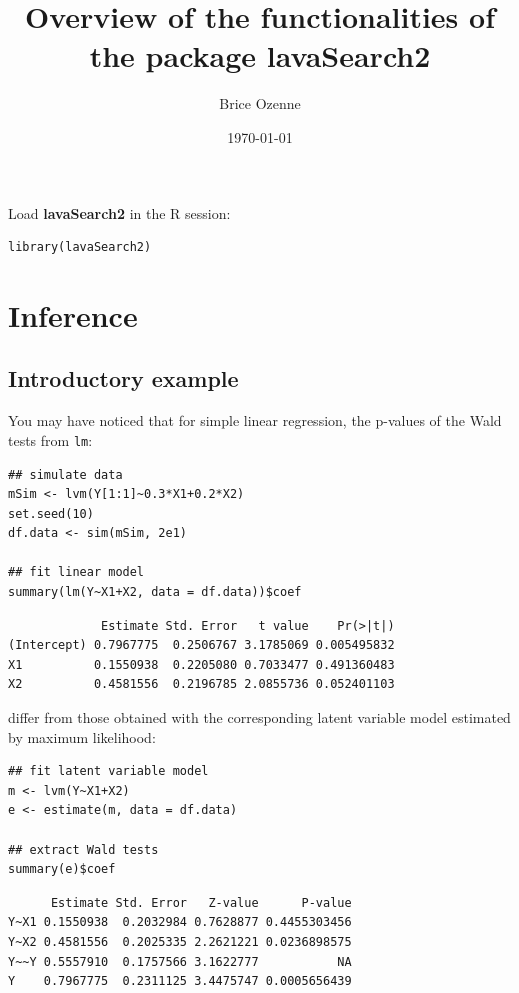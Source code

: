 \documentclass[12pt]{article}
\author{Brice Ozenne}
\date{\today}
\title{Overview of the functionalities of the package lavaSearch2}
\begin{document}
\maketitle
Load \textbf{lavaSearch2} in the R session:
\lstset{language=r,label= ,caption= ,captionpos=b,numbers=none}
\begin{lstlisting}
library(lavaSearch2)
\end{lstlisting}

\section{Inference}
\label{sec:orgd83149a}
\subsection{Introductory example}
\label{sec:org7647657}
You may have noticed that for simple linear regression, the p-values
of the Wald tests from \texttt{lm}:
\lstset{language=r,label= ,caption= ,captionpos=b,numbers=none}
\begin{lstlisting}
## simulate data
mSim <- lvm(Y[1:1]~0.3*X1+0.2*X2)
set.seed(10)
df.data <- sim(mSim, 2e1)

## fit linear model
summary(lm(Y~X1+X2, data = df.data))$coef
\end{lstlisting}

\begin{verbatim}
             Estimate Std. Error   t value    Pr(>|t|)
(Intercept) 0.7967775  0.2506767 3.1785069 0.005495832
X1          0.1550938  0.2205080 0.7033477 0.491360483
X2          0.4581556  0.2196785 2.0855736 0.052401103
\end{verbatim}


differ from those obtained with the corresponding latent variable
model estimated by maximum likelihood:
\lstset{language=r,label= ,caption= ,captionpos=b,numbers=none}
\begin{lstlisting}
## fit latent variable model
m <- lvm(Y~X1+X2)
e <- estimate(m, data = df.data)

## extract Wald tests
summary(e)$coef
\end{lstlisting}

\begin{verbatim}
      Estimate Std. Error   Z-value      P-value
Y~X1 0.1550938  0.2032984 0.7628877 0.4455303456
Y~X2 0.4581556  0.2025335 2.2621221 0.0236898575
Y~~Y 0.5557910  0.1757566 3.1622777           NA
Y    0.7967775  0.2311125 3.4475747 0.0005656439
\end{verbatim}
\end{document}
